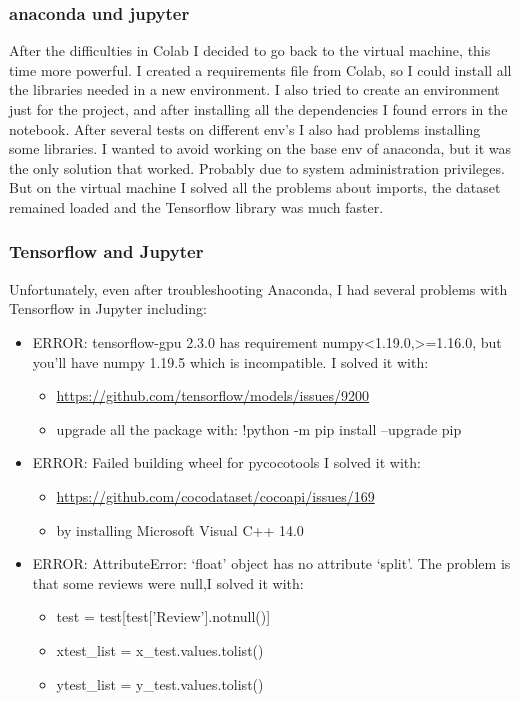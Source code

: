 \subsubsection{\gls{anaconda} und \gls{jupyter}}
After the difficulties in Colab I decided to go back to the virtual machine, this time more powerful. I created a requirements file from Colab, so I could install all the libraries needed in a new environment. I also tried to create an environment just for the project, and after installing all the dependencies I found errors in the notebook. After several tests on different env's I also had problems installing some libraries. I wanted to avoid working on the base env of anaconda, but it was the only solution that worked. Probably due to system administration privileges. But on the virtual machine I solved all the problems about imports, the dataset remained loaded and the Tensorflow library was much faster.

\subsubsection{Tensorflow and Jupyter}
Unfortunately, even after troubleshooting Anaconda, I had several problems with Tensorflow in Jupyter including:
\begin{itemize}
    \item ERROR: tensorflow-gpu 2.3.0 has requirement numpy<1.19.0,>=1.16.0, but you'll have numpy 1.19.5 which is incompatible.
    I solved it with:
        \begin{itemize}
            \item \url{https://github.com/tensorflow/models/issues/9200}
            \item upgrade all the package with: !python -m pip install --upgrade pip
        \end{itemize}
    \item ERROR: Failed building wheel for pycocotools
    I solved it with:
        \begin{itemize}
            \item \url{https://github.com/cocodataset/cocoapi/issues/169}
            \item by installing Microsoft Visual C++ 14.0
        \end{itemize}
    \item ERROR: AttributeError: `float' object has no attribute `split'.
     The problem is that some reviews were null,I solved it with:
        \begin{itemize}
            \item test = test[test['Review'].notnull()]
            \item xtest\_list = x\_test.values.tolist()
            \item ytest\_list = y\_test.values.tolist()
        \end{itemize}
\end{itemize}

